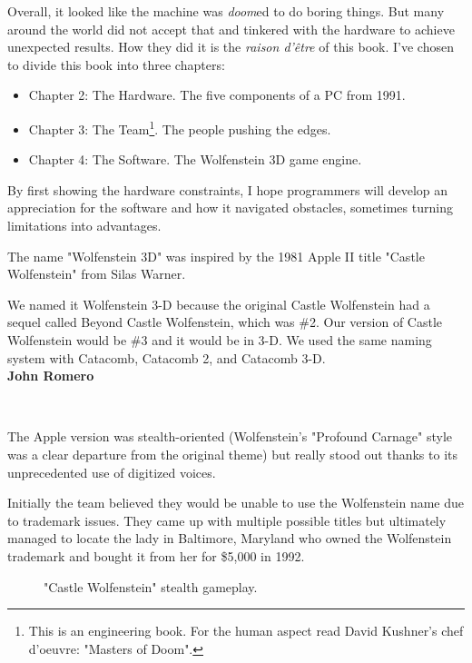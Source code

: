 Overall, it looked like the machine was \emph{doom}ed to do boring things. But many around the world did not accept that and tinkered with the hardware to achieve unexpected results. How they did it is the \textit{raison d'\^etre} of this book. I've chosen to divide this book into three chapters:
\begin{itemize}
\item Chapter 2: The Hardware. The five components of a PC from 1991.
\item Chapter 3: The Team\footnote{This is an engineering book. For the human aspect read David Kushner's chef d'oeuvre: "Masters of Doom".}. The people pushing the edges.
\item Chapter 4: The Software. The Wolfenstein 3D game engine.
\end{itemize}
\par
By first showing the hardware constraints, I hope programmers will develop an appreciation for the software and how it navigated obstacles, sometimes turning limitations into advantages.\\
\pagebreak



  The name "Wolfenstein 3D" was inspired by the 1981 Apple II title "Castle Wolfenstein" from Silas Warner.\\
\par
 \begin{fancyquotes}
   We named it Wolfenstein 3-D because the original Castle Wolfenstein had a sequel called Beyond Castle Wolfenstein, which was \#2. Our version of Castle Wolfenstein would be \#3 and it would be in 3-D. We used the same naming system with Catacomb, Catacomb 2, and Catacomb 3-D.
 \bigskip \\
\textbf{John Romero}
 \end{fancyquotes}
 \\
\par
\par
 \par The Apple version was stealth-oriented (Wolfenstein's "Profound Carnage" style was a clear departure from the original theme) but really stood out thanks to its unprecedented use of digitized voices.\\
 \par
 Initially the team believed they would be unable to use the Wolfenstein name due to trademark issues. They came up with multiple possible titles but ultimately managed to locate the lady in Baltimore, Maryland who owned the Wolfenstein trademark and bought it from her for \$5,000 in 1992.\\
 \par


\begin{figure}[H]
\centering
{}
\caption{"Castle Wolfenstein" stealth gameplay.}
\end{figure}


